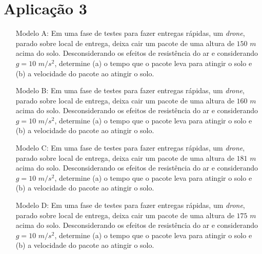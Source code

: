 \section{Aplicação 3} \label{ch:ASA1a3}
\begin{itemize}
    \item[Modelo A:] Em uma fase de testes para fazer entregas rápidas, um \textit{drone}, parado sobre local de entrega, deixa cair um pacote de uma altura de $150$ $m$ acima do solo. Desconsiderando os efeitos de resistência do ar e considerando $g=10$ $m/s^2$, determine (a) o tempo que o pacote leva para atingir o solo e (b) a velocidade do pacote ao atingir o solo.
    
    \item[Modelo B:] Em uma fase de testes para fazer entregas rápidas, um \textit{drone}, parado sobre local de entrega, deixa cair um pacote de uma altura de $160$ $m$ acima do solo. Desconsiderando os efeitos de resistência do ar e considerando $g=10$ $m/s^2$, determine (a) o tempo que o pacote leva para atingir o solo e (b) a velocidade do pacote ao atingir o solo.
    
    \item[Modelo C:] Em uma fase de testes para fazer entregas rápidas, um \textit{drone}, parado sobre local de entrega, deixa cair um pacote de uma altura de $181$ $m$ acima do solo. Desconsiderando os efeitos de resistência do ar e considerando $g=10$ $m/s^2$, determine (a) o tempo que o pacote leva para atingir o solo e (b) a velocidade do pacote ao atingir o solo.
    
    \item[Modelo D:] Em uma fase de testes para fazer entregas rápidas, um \textit{drone}, parado sobre local de entrega, deixa cair um pacote de uma altura de $175$ $m$ acima do solo. Desconsiderando os efeitos de resistência do ar e considerando $g=10$ $m/s^2$, determine (a) o tempo que o pacote leva para atingir o solo e (b) a velocidade do pacote ao atingir o solo.
    
\end{itemize}

